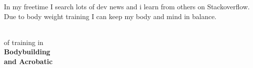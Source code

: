 \documentclass[10pt,A4]{article}
\begin{document}
\begin{minipage}{0.59\textwidth}
{		%
		\parbox[b][3cm][c]{4cm}{
			\textcolor{textcol}{In my freetime I search lots of dev news and i learn from others on Stackoverflow. Due to body weight training I can keep my body and mind in balance.}
		}
		
		\parbox[b][3cm][c]{3cm}{
			\begin{center}
			\\
			\textcolor{textcol}{of training in}\\
			\textcolor{textcol}{\textbf{Bodybuilding\\and Acrobatic}}
			\end{center}
		}
	}

\vspace{-70pt}\end{minipage}
\begin{minipage}{0.05\textwidth}
	\begin{center}
	\end{center}
\end{minipage}
\end{document}
